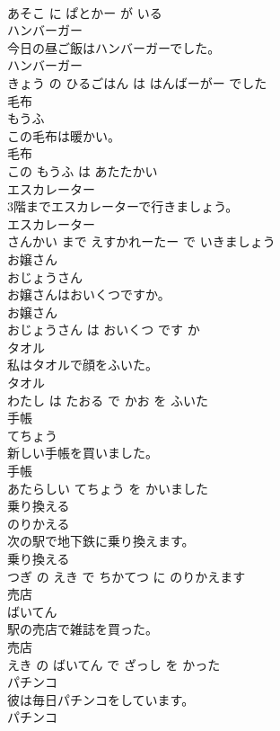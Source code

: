 \documentclass[8pt]{extreport}
\begin{document}
\begin{CJK}{UTF8}{min}
\\	あそこ に ぱとかー が いる			
\\	ハンバーガー	
\\	今日の昼ご飯はハンバーガーでした。	
\\	ハンバーガー 
\\	きょう の ひるごはん は はんばーがー でした			
\\	毛布	
\\	もうふ			
\\	この毛布は暖かい。	
\\	毛布 
\\	この もうふ は あたたかい			
\\	エスカレーター	
\\	3階までエスカレーターで行きましょう。	
\\	エスカレーター 
\\	さんかい まで えすかれーたー で いきましょう			
\\	お嬢さん	
\\	おじょうさん			
\\	お嬢さんはおいくつですか。	
\\	お嬢さん 
\\	おじょうさん は おいくつ です か			
\\	タオル	
\\	私はタオルで顔をふいた。	
\\	タオル 
\\	わたし は たおる で かお を ふいた			
\\	手帳	
\\	てちょう			
\\	新しい手帳を買いました。	
\\	手帳 
\\	あたらしい てちょう を かいました			
\\	乗り換える	
\\	のりかえる			
\\	次の駅で地下鉄に乗り換えます。	
\\	乗り換える 
\\	つぎ の えき で ちかてつ に のりかえます			
\\	売店	
\\	ばいてん			
\\	駅の売店で雑誌を買った。	
\\	売店 
\\	えき の ばいてん で ざっし を かった			
\\	パチンコ	
\\	彼は毎日パチンコをしています。	
\\	パチンコ 

\end{CJK}
\end{document}
